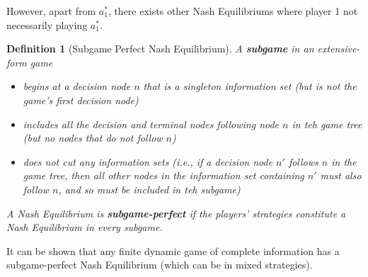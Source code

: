 \documentclass[12pt]{article}
\newtheorem{definition}{Definition}[section]
\theoremstyle{definition}
\begin{document}
However, apart from $a_1^\ast$, there exists other Nash Equilibriums where player 1 not necessarily playing $a_1^\ast$.
\begin{definition}[Subgame Perfect Nash Equilibrium]
\normalfont A \textbf{subgame} in an extensive-form game
\begin{itemize}
  \item begins at a decision node $n$ that is a singleton information set (but is not the game's first decision node)
  \item includes all the decision and terminal nodes following node $n$ in teh game tree (but no nodes that do not follow $n$)
  \item does not cut any information sets (i.e., if a decision node $n'$ follows $n$ in the game tree, then all other nodes in the information set containing $n'$ must also follow $n$, and so must be included in teh subgame)
\end{itemize}
A Nash Equilibrium is \textbf{subgame-perfect} if the players' strategies constitute a Nash Equilibrium in every subgame.
\end{definition}
It can be shown that any finite dynamic game of complete information has a subgame-perfect Nash Equilibrium (which can be in mixed strategies).
\end{document}
